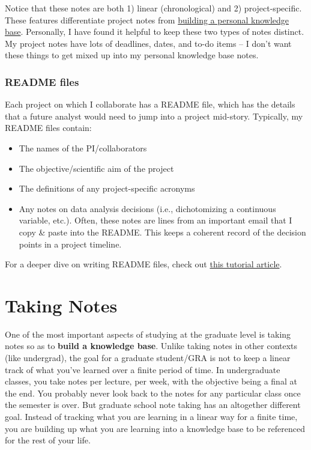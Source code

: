 \documentclass[
]{book}
\begin{document}
Notice that these notes are both 1) linear (chronological) and 2) project-specific. These features differentiate project notes from \protect\hyperlink{zettelkasten}{building a personal knowledge base}. Personally, I have found it helpful to keep these two types of notes distinct. My project notes have lots of deadlines, dates, and to-do items -- I don't want these things to get mixed up into my personal knowledge base notes.

\hypertarget{readme}{%
\subsection{README files}\label{readme}}

Each project on which I collaborate has a README file, which has the details that a future analyst would need to jump into a project mid-story. Typically, my README files contain:

\begin{itemize}
\item
  The names of the PI/collaborators
\item
  The objective/scientific aim of the project
\item
  The definitions of any project-specific acronyms
\item
  Any notes on data analysis decisions (i.e., dichotomizing a continuous variable, etc.). Often, these notes are lines from an important email that I copy \& paste into the README. This keeps a coherent record of the decision points in a project timeline.
\end{itemize}

For a deeper dive on writing README files, check out \href{https://www.freecodecamp.org/news/how-to-write-a-good-readme-file/}{this tutorial article}.

\hypertarget{taking-notes}{%
\chapter{Taking Notes}\label{taking-notes}}

One of the most important aspects of studying at the graduate level is taking notes so as to \textbf{build a knowledge base}. Unlike taking notes in other contexts (like undergrad), the goal for a graduate student/GRA is not to keep a linear track of what you've learned over a finite period of time. In undergraduate classes, you take notes per lecture, per week, with the objective being a final at the end. You probably never look back to the notes for any particular class once the semester is over. But graduate school note taking has an altogether different goal. Instead of tracking what you are learning in a linear way for a finite time, you are building up what you are learning into a knowledge base to be referenced for the rest of your life.
\end{document}
